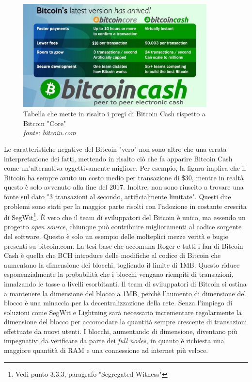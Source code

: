 \documentclass {article}
\begin{document}
\vspace {0.5cm}
\begin{figure}[htb!]
\includegraphics [width = 10cm] {bcash.png}
\centering
\captionsetup{width=1.4\linewidth}
\caption {Tabella che mette in risalto i pregi di Bitcoin Cash rispetto a Bitcoin "Core"\\\textit{fonte: bitcoin.com}}
\end{figure}
\vspace {0.2cm}
\noindent
%
Le caratteristiche negative del Bitcoin "vero" non sono altro che una errata interpretazione dei fatti, mettendo in risalto ciò che fa apparire Bitcoin Cash come un'alternativa oggettivamente migliore.
Per esempio, la figura implica che il Bitcoin ha sempre avuto un costo medio per transazione di \$30, mentre in realtà questo è solo avvenuto alla fine del 2017.
Inoltre, non sono riuscito a trovare una fonte sul dato "3 transazioni al secondo, artificialmente limitate".
Questi due problemi sono stati per la maggior parte risolti con l'adozione in costante crescita di SegWit\footnote{Vedi punto 3.3.3, paragrafo "Segregated Witness"}.
È vero che il team di sviluppatori del Bitcoin è unico, ma essendo un progetto \textit{open source}, chiunque può contribuire miglioramenti al codice sorgente del software.
Questo è solo un esempio delle molteplici mezze verità e bugie presenti su bitcoin.com.
La tesi base che accomuna Roger e tutti i fan di Bitcoin Cash è quella che BCH introduce delle modifiche al codice di Bitcoin che aumentano la dimensione dei blocchi, togliendo il limite di 1MB.
Questo riduce esponenzialmente la probabilità che i blocchi vengano riempiti di transazioni, innalzando le tasse a livelli esorbitanti.
Il team di sviluppatori di Bitcoin si ostina a mantenere la dimensione del blocco a 1MB, perchè l'aumento di dimensione del blocco è una minaccia per la decentralizzazione della rete.
Senza l'impiego di soluzioni come SegWit e Lightning sarà necessario incrementare regolarmente la dimensione del blocco per accomodare la quantità sempre crescente di transazioni effettuate da nuovi utenti.
I blocchi, aumentando di dimensione, diventano più impegnativi da verificare da parte dei \textit{full nodes}, in quanto è richiesta una maggiore quantità di RAM e una connessione ad internet più veloce.
\end{document}
